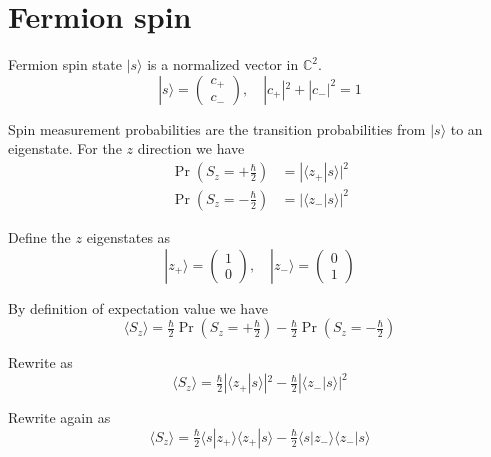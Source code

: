 


\section*{Fermion spin}

Fermion spin state $|s\rangle$ is a normalized vector in $\mathbb C^2$.
\begin{equation*}
|s\rangle=\begin{pmatrix}c_+\\c_-\end{pmatrix},\quad|c_+|^2+|c_-|^2=1
\end{equation*}

Spin measurement probabilities are the transition probabilities from $|s\rangle$ to an eigenstate.
For the $z$ direction we have
\begin{align*}
\Pr\left(S_z=+\tfrac{\hbar}{2}\right)&=|\langle z_+|s\rangle|^2
\\
\Pr\left(S_z=-\tfrac{\hbar}{2}\right)&=|\langle z_-|s\rangle|^2
\end{align*}

Define the $z$ eigenstates as
\begin{equation*}
|z_+\rangle=\begin{pmatrix}1\\0\end{pmatrix},\quad
|z_-\rangle=\begin{pmatrix}0\\1\end{pmatrix}
\end{equation*}

By definition of expectation value we have
\begin{equation*}
\langle S_z\rangle
=\tfrac{\hbar}{2}\Pr\left(S_z=+\tfrac{\hbar}{2}\right)
-\tfrac{\hbar}{2}\Pr\left(S_z=-\tfrac{\hbar}{2}\right)
\end{equation*}

Rewrite as
\begin{equation*}
\langle S_z\rangle=\tfrac{\hbar}{2}|\langle z_+|s\rangle|^2-\tfrac{\hbar}{2}|\langle z_-|s\rangle|^2
\end{equation*}

Rewrite again as
\begin{equation*}
\langle S_z\rangle
=\tfrac{\hbar}{2}\langle s|z_+\rangle\langle z_+|s\rangle
-\tfrac{\hbar}{2}\langle s|z_-\rangle\langle z_-|s\rangle
\end{equation*}

